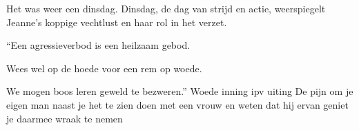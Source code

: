 Het was weer een dinsdag.
Dinsdag, de dag van strijd en actie, weerspiegelt Jeanne’s koppige vechtlust en haar rol in het verzet.

“Een agressieverbod
is een heilzaam gebod.

Wees wel op de hoede
voor een rem op woede.

We mogen boos leren
geweld te bezweren.”
Woede inning ipv uiting
De pijn om je eigen man naast je het te zien doen met een vrouw en weten dat hij ervan geniet je daarmee wraak te nemen
